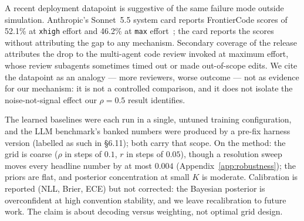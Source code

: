A recent deployment datapoint is suggestive of the same failure mode
outside simulation. Anthropic's Sonnet~5.5 system card reports
FrontierCode scores of 52.1\% at \texttt{xhigh} effort and 46.2\% at
\texttt{max} effort~\cite{anthropic2026sonnet55card}; the card
reports the scores without attributing the gap to any mechanism.
Secondary coverage of the release attributes the drop to the
multi-agent code review invoked at maximum effort, whose review
subagents sometimes timed out or made out-of-scope edits. We cite the
datapoint as an analogy --- more reviewers, worse outcome --- not as
evidence for our mechanism: it is not a controlled comparison, and it
does not isolate the noise-not-signal effect our $\rho=0.5$ result
identifies.

The learned baselines were each run in a single, untuned training
configuration, and the LLM benchmark's banked numbers were produced by
a pre-fix harness version (labelled as such in \S6.11); both carry
that scope. On the method: the grid is coarse ($\rho$ in steps of $0.1$, $r$ in steps
of $0.05$), though a resolution sweep moves every headline number by at
most $0.004$ (Appendix~\ref{app:robustness}); the priors are flat, and
posterior concentration at small $K$ is moderate. Calibration is
reported (NLL, Brier, ECE) but not corrected: the Bayesian posterior is
overconfident at high convention stability, and we leave recalibration
to future work. The claim is about decoding versus weighting, not optimal
grid design.
